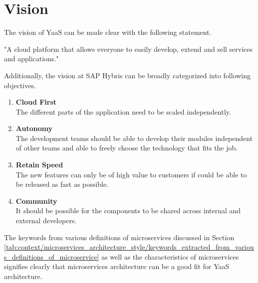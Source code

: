 \section{Vision}\label{section:hybris_architecture/vision}
The vision of \acrshort{YaaS} can be made clear with the following statement.
\begin{shaded}
"A cloud platform that allows everyone to easily develop, extend and sell services and applications." \\
\cite{Stubbe:2015aa}
\end{shaded}
Additionally, the vision at SAP Hybris can be broadly categorized into following objectives.\\
\begin{enumerate}
\item \textbf{Cloud First}\\
The different parts of the application need to be scaled independently.
\item \textbf{Autonomy}\\
The development teams should be able to develop their modules independent of other teams and able to freely choose the technology that fits the job.
\item \textbf{Retain Speed}\\
The new features can only be of high value to customers if could be able to be released as fast as possible.
\item \textbf{Community}\\
It should be possible for the components to be shared across internal and external developers.
\end{enumerate}
The keywords from various definitions of microservices discussed in Section \ref{tab:context/microservices_architecture_style/keywords_extracted_from_various_definitions_of_microservice} as well as the characteristics of microservices signifies clearly that microservices architecture can be a good fit for \acrshort{YaaS} architecture.
